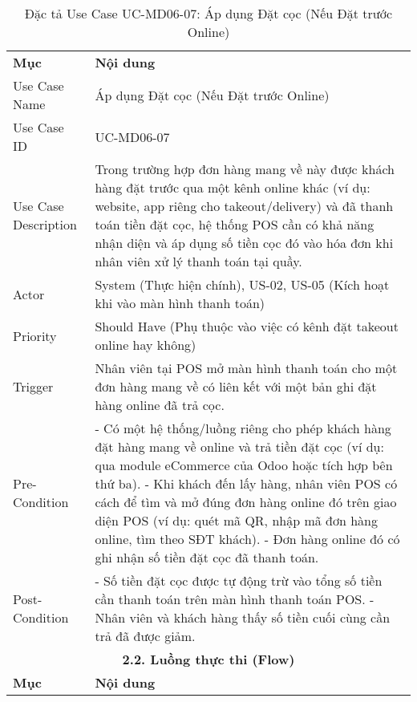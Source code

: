 \begin{longtable}{|m{4cm}|p{11cm}|}
\caption{Đặc tả Use Case UC-MD06-07: Áp dụng Đặt cọc (Nếu Đặt trước Online)} \label{tab:uc_md06_07} \\
\hline

\endhead %
\hline
\endfoot %
\hline
\endlastfoot %
\multicolumn{2}{|c|}{\textbf{2.1. Tóm tắt (Summary)}} \\
\hline
\textbf{Mục} & \textbf{Nội dung} \\
\hline
Use Case Name & Áp dụng Đặt cọc (Nếu Đặt trước Online) \\
\hline
Use Case ID & UC-MD06-07 \\
\hline
Use Case Description & Trong trường hợp đơn hàng mang về này được khách hàng đặt trước qua một kênh online khác (ví dụ: website, app riêng cho takeout/delivery) và đã thanh toán tiền đặt cọc, hệ thống POS cần có khả năng nhận diện và áp dụng số tiền cọc đó vào hóa đơn khi nhân viên xử lý thanh toán tại quầy. \\
\hline
Actor & System (Thực hiện chính), US-02, US-05 (Kích hoạt khi vào màn hình thanh toán) \\
\hline
Priority & Should Have (Phụ thuộc vào việc có kênh đặt takeout online hay không) \\
\hline
Trigger & Nhân viên tại POS mở màn hình thanh toán cho một đơn hàng mang về có liên kết với một bản ghi đặt hàng online đã trả cọc. \\
\hline
Pre-Condition & - Có một hệ thống/luồng riêng cho phép khách hàng đặt hàng mang về online và trả tiền đặt cọc (ví dụ: qua module eCommerce của Odoo hoặc tích hợp bên thứ ba). \newline - Khi khách đến lấy hàng, nhân viên POS có cách để tìm và mở đúng đơn hàng online đó trên giao diện POS (ví dụ: quét mã QR, nhập mã đơn hàng online, tìm theo SĐT khách). \newline - Đơn hàng online đó có ghi nhận số tiền đặt cọc đã thanh toán. \\
\hline
Post-Condition & - Số tiền đặt cọc được tự động trừ vào tổng số tiền cần thanh toán trên màn hình thanh toán POS. \newline - Nhân viên và khách hàng thấy số tiền cuối cùng cần trả đã được giảm. \\
\hline
\multicolumn{2}{|c|}{\textbf{2.2. Luồng thực thi (Flow)}} \\
\hline
\textbf{Mục} & \textbf{Nội dung} \\
\hline

\end{longtable}
